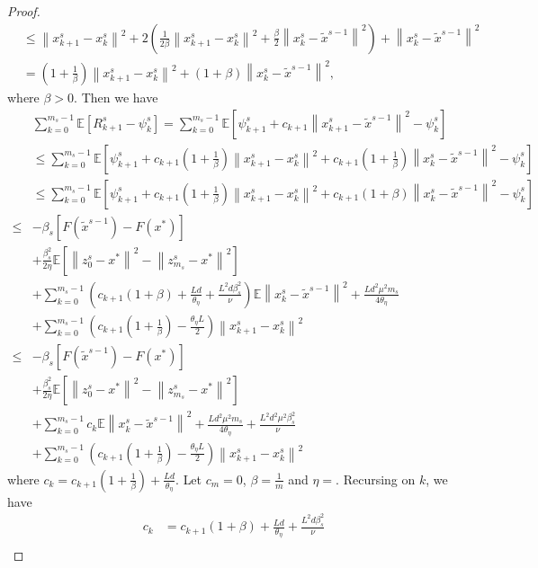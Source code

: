 \documentclass{article}
\newcommand*{\E}{\mathbb{E}}
\newcommand{\norm}[1]{\left\lVert#1\right\rVert}
\theoremstyle{definition}
\theoremstyle{remark}
\begin{document}
\begin{proof}
\begin{equation}
\begin{split}
&\leq \norm{x_{k+1}^s-x_{k}^s}^2 + 2(\frac{1}{2\beta}\norm{x_{k+1}^s-x_{k}^s}^2+\frac{\beta}{2}\norm{x_k^s-\widetilde{x}^{s-1}}^2)+\norm{x_k^s-\widetilde{x}^{s-1}}^2\\
&= (1+\frac{1}{\beta})\norm{x_{k+1}^s-x_{k}^s}^2+(1+\beta)\norm{x_k^s-\widetilde{x}^{s-1}}^2,
\end{split}
\end{equation}
where $\beta > 0$. Then we have 
\begin{equation}
\begin{split}
&\sum_{k=0}^{m_s-1} \E[R_{k+1}^s - \psi_{k}^s] = \sum_{k=0}^{m_s-1}\E\left[\psi_{k+1}^s+ c_{k+1}\norm{x_{k+1}^s-\tilde{x}^{s-1}}^2- \psi_{k}^s\right]\\
&\leq \sum_{k=0}^{m_s-1}\E\left[\psi_{k+1}^s+ c_{k+1}(1+\frac{1}{\beta})\norm{x_{k+1}^s-x_{k}^s}^2+ c_{k+1}(1+\frac{1}{\beta})\norm{x_{k}^s-\tilde{x}^{s-1}}^2- \psi_{k}^s\right]\\
&\leq \sum_{k=0}^{m_s-1}\E\left[\psi_{k+1}^s+ c_{k+1}(1+\frac{1}{\beta})\norm{x_{k+1}^s-x_{k}^s}^2+ c_{k+1}(1+{\beta})\norm{x_{k}^s-\tilde{x}^{s-1}}^2- \psi_{k}^s\right]\\
\leq &-\beta_s[F(\widetilde{x}^{s-1})-F(x^*)] \\
&+ {\frac{ \beta_s^2}{2\eta}}\E[\norm{z_{0}^s-x^*}^2-\norm{z_{m_s}^s-x^*}^2]\\
&+ \sum_{k=0}^{m_s-1} (c_{k+1}(1+{\beta})+\frac{Ld}{\theta_{\eta}}+\frac{L^2d\beta_s^2}{\nu})\E\norm{x_k^s-\widetilde{x}^{s-1}}^2+\frac{Ld^2\mu^2m_s}{4\theta_{\eta}}\\
&+\sum_{k=0}^{m_s-1}(c_{k+1}(1+\frac{1}{\beta})-\frac{\theta_{\eta} L}{2})\norm{x_{k+1}^s-x_{k}^s}^2\\
\leq &-\beta_s[F(\widetilde{x}^{s-1})-F(x^*)] \\
&+ {\frac{ \beta_s^2}{2\eta}}\E[\norm{z_{0}^s-x^*}^2-\norm{z_{m_s}^s-x^*}^2]\\
&+ \sum_{k=0}^{m_s-1} c_k\E\norm{x_k^s-\widetilde{x}^{s-1}}^2+\frac{Ld^2\mu^2m_s}{4\theta_{\eta}}+\frac{L^2d^2\mu^2\beta_s^2}{\nu}\\
&+\sum_{k=0}^{m_s-1}(c_{k+1}(1+\frac{1}{\beta})-\frac{\theta_{\eta} L}{2})\norm{x_{k+1}^s-x_{k}^s}^2
\end{split}
\end{equation}
where $c_k = c_{k+1}(1+\frac{1}{\beta})+\frac{Ld}{\theta_{\eta}}$. {\color{red} Let $c_m=0$, $\beta=\frac{1}{m}$ and $\eta = $}. Recursing on $k$, we have 
\begin{equation}
\begin{split}
c_k &= {c_{k+1}(1+{\beta})+\frac{Ld}{\theta_{\eta}}+\frac{L^2d\beta_s^2}{\nu}} \\

\end{split}
\end{equation}
\end{proof}
\end{document}
